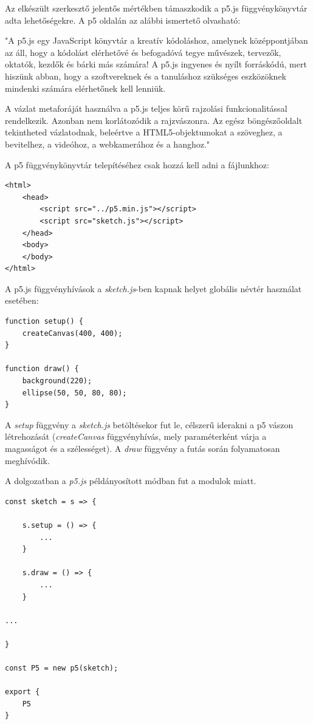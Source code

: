 

Az elkészült szerkesztő jelentős mértékben támaszkodik a p5.js függvénykönyvtár adta lehetőségekre. A p5 oldalán az alábbi ismertető olvasható:

"A p5.js egy JavaScript könyvtár a kreatív kódoláshoz, amelynek középpontjában az áll, hogy a kódolást elérhetővé és befogadóvá tegye művészek, tervezők, oktatók, kezdők és bárki más számára! A p5.js ingyenes és nyílt forráskódú, mert hiszünk abban, hogy a szoftvereknek és a tanuláshoz szükséges eszközöknek mindenki számára elérhetőnek kell lenniük.

A vázlat metaforáját használva a p5.js teljes körű rajzolási funkcionalitással rendelkezik. Azonban nem korlátozódik a rajzvászonra. Az egész böngészőoldalt tekintheted vázlatodnak, beleértve a HTML5-objektumokat a szöveghez, a bevitelhez, a videóhoz, a webkamerához és a hanghoz\cite{p5js}."


A p5 függvénykönyvtár telepítéséhez csak hozzá kell adni a fájlunkhoz:

\begin{lstlisting}[style=html]
<html>
	<head>
		<script src="../p5.min.js"></script>
		<script src="sketch.js"></script>
	</head>
	<body>
	</body>
</html>
\end{lstlisting}


A p5.js függvényhívások a \textit{sketch.js}-ben kapnak helyet globális névtér használat esetében:

\begin{lstlisting}[style=es6]
function setup() {
	createCanvas(400, 400);
}

function draw() {
	background(220);
	ellipse(50, 50, 80, 80);
}
\end{lstlisting}

A \textit{setup} függvény a \textit{sketch.js} betöltésekor fut le, célszerű iderakni a p5 vászon létrehozását (\textit{createCanvas} függvényhívás, mely paraméterként várja a magasságot és a szélességet). A \textit{draw} függvény a futás során folyamatosan meghívódik.

A dolgozatban a \textit{p5.js} példányosított módban fut a modulok miatt.
\begin{lstlisting}[style=es6]
const sketch = s => {
	
	s.setup = () => {
		...
	}
	
	s.draw = () => {
		...
	}

...

}

const P5 = new p5(sketch);

export {
	P5
}
\end{lstlisting}

